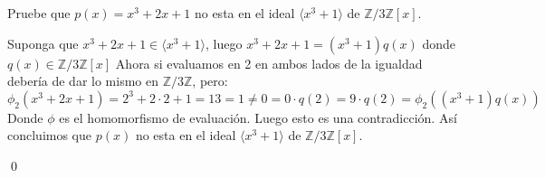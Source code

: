 \begin{homeworkProblem}
    Pruebe que $p(x)=x^3+2x+1$ no esta en el ideal $\langle x^3+1\rangle$ de $\mathbb{Z}/3\mathbb{Z}[x].$
    \begin{solucion}
        Suponga que $x^3+2x+1\in\langle x^3+1\rangle$, luego $x^3+2x+1=(x^3+1)q(x)$ donde $q(x)\in\mathbb{Z}/3\mathbb{Z}[x]$ Ahora si evaluamos en 2 en ambos lados de la igualdad debería de dar lo mismo en $\mathbb{Z}/3\mathbb{Z}$, pero:
        $$\phi_2(x^3+2x+1)=2^3+2\cdot2+1=13=1\neq0=0\cdot q(2)=9\cdot q(2)=\phi_2((x^3+1)q(x))$$
        Donde $\phi$ es el homomorfismo de evaluación. Luego esto es una contradicción. Así concluimos que $p(x)$ no esta en el ideal $\langle x^3+1\rangle$ de $\mathbb{Z}/3\mathbb{Z}[x].$

        \qed
    \end{solucion}
\end{homeworkProblem}

